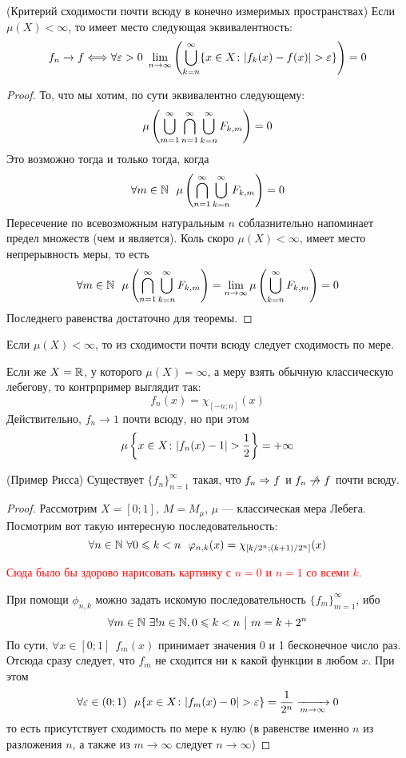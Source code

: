 \begin{theorem} (Критерий сходимости почти всюду в конечно измеримых пространствах)
	Если $\mu(X) < \infty$, то имеет место следующая эквивалентность:
	\[
		f_n \to f \Longleftrightarrow \forall \eps >0\ \lim_{n \to \infty} \ps{\bigcup_{k = n}^\infty \{x \in X \colon |f_k(x) - f(x)| > \eps\}} = 0
	\]
\end{theorem}

\begin{proof}
	То, что мы хотим, по сути эквивалентно следующему:
	\[
		\mu\left(\bigcup_{m = 1}^\infty \bigcap_{n = 1}^\infty \bigcup_{k = n}^\infty F_{k, m}\right) = 0
	\]
	Это возможно тогда и только тогда, когда
	\[
		\forall m \in \mathbb{N}\ \ \mu\left(\bigcap_{n = 1}^\infty \bigcup_{k = n}^\infty F_{k, m}\right) = 0
	\]
	Пересечение по всевозможным натуральным $n$ соблазнительно напоминает предел множеств (чем и является). Коль скоро $\mu(X) < \infty$, имеет место непрерывность меры, то есть
	\[
		\forall m \in \mathbb{N}\ \ \mu\left(\bigcap_{n = 1}^\infty \bigcup_{k = n}^\infty F_{k, m}\right) = \lim_{n \to \infty} \mu\left(\bigcup_{k = n}^\infty F_{k, m}\right) = 0
	\]
	Последнего равенства достаточно для теоремы.
\end{proof}

\begin{corollary}
	Если $\mu(X) < \infty$, то из сходимости почти всюду следует сходимость по мере.
\end{corollary}

\begin{note}
	Если же $X = \mathbb{R}$, у которого $\mu(X) = \infty$, а меру взять обычную классическую лебегову, то контрпример выглядит так:
	\[
		f_n(x) = \chi_{[-n; n]}(x)
	\]
	Действительно, $f_n \to 1$ почти всюду, но при этом
	\[
		\mu\left\{x \in X \colon |f_n(x) - 1| > \frac{1}{2}\right\} = +\infty
	\]
\end{note}

\begin{theorem} (Пример Рисса)
	Существует $\{f_n\}_{n = 1}^\infty$ такая, что $f_n \Rightarrow f$ и $f_n \centernot\to f$ почти всюду.
\end{theorem}

\begin{proof}
	Рассмотрим $X = [0; 1]$, $M = M_\mu$, $\mu$ --- классическая мера Лебега. Посмотрим вот такую интересную последовательность:
	\[
		\forall n \in \N\ \forall 0 \le k < n\ \ \phi_{n, k}(x) = \chi_{\sbr{k / 2^n; (k + 1) / 2^n}}(x)
	\]
	
	\textcolor{red}{Сюда было бы здорово нарисовать картинку с $n = 0$ и $n = 1$ со всеми $k$.}
	
	При помощи $\phi_{n, k}$ можно задать искомую последовательность $\{f_m\}_{m = 1}^\infty$, ибо
	\[
		\forall m \in \mathbb{N}\ \exists! n \in \mathbb{N}, 0 \leqslant k < n \ \big|\  m = k + 2^n
	\]
	По сути, $\forall x \in [0; 1]\ \ f_m(x)$ принимает значения 0 и 1 бесконечное число раз. Отсюда сразу следует, что $f_m$ не сходится ни к какой функции в любом $x$. При этом
	\[
		\forall \varepsilon \in (0; 1)\ \ \mu\{x \in X \colon |f_m(x) - 0| > \varepsilon\} = \frac{1}{2^n} \xrightarrow[m \to \infty]{} 0
	\]
	то есть присутствует сходимость по мере к нулю (в равенстве именно $n$ из разложения $n$, а также из $m \to \infty$ следует $n \to \infty$)
\end{proof}

